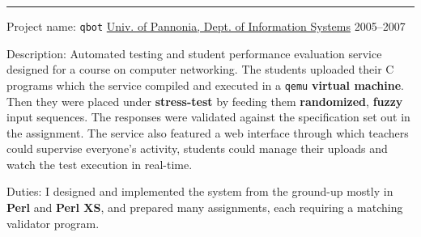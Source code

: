\documentclass[a4paper,12pt]{article}
\newcommand\Yell{\textbf}
\newcommand\Label{\textsf}
\newcommand{\midline}{\rule[0.5ex]{\linewidth-\parindent}{.5pt}}
\begin{document}
\midline\par
\Label{Project name}: \texttt{qbot}\hfill
\href{http://virt.uni-pannon.hu/index.php/about-the-department}%
{Univ. of Pannonia, Dept. of Information Systems}
\Label{2005--2007}\par\medskip
\Label{Description}: Automated testing and student performance evaluation
service designed for a course on computer networking.  The students uploaded
their C programs which the service compiled and executed in a \texttt{qemu}
\Yell{virtual machine}.  Then they were placed under \Yell{stress-test} by
feeding them \Yell{randomized}, \Yell{fuzzy} input sequences.  The responses
were validated against the specification set out in the assignment.
The service also featured a web interface through which teachers could
supervise everyone's activity, students could manage their uploads and
watch the test execution in real-time.\par\medskip
\Label{Duties}: I designed and implemented the system from the ground-up
mostly in \Yell{Perl} and \Yell{Perl XS}, and prepared many assignments,
each requiring a matching validator program.

%
\end{document}
